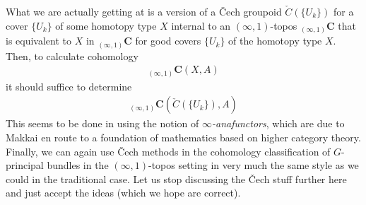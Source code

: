What we are actually getting at is a version of a \v{C}ech groupoid $\check{C}(\lbrace U_{k} \rbrace)$ for a cover $\lbrace U_{k} \rbrace$ of some homotopy type $X$ internal to an $(\infty,1)$-topos ${}_{(\infty,1)}\mathbf{C}$ that is equivalent to $X$ in ${}_{(\infty,1)}\mathbf{C}$ for good covers $\lbrace U_{k} \rbrace$ of the homotopy type $X$.
Then, to calculate cohomology
\begin{align*}
  {}_{(\infty,1)}\mathbf{C}
  \left(
    X,
    A
  \right)
\end{align*}
it should suffice to determine
\begin{align*}
  {}_{(\infty,1)}\mathbf{C}
  \left(
    \check{C}(\lbrace U_{k} \rbrace),
    A
  \right)
\end{align*}
This seems to be done in \cite{a565d200} using the notion of \textit{$\infty$-anafunctors}, which are due to Makkai en route to a foundation of mathematics based on higher category theory.
Finally, we can again use \v{C}ech methods in the cohomology classification of $G$-principal bundles in the $(\infty,1)$-topos setting in very much the same style as we could in the traditional case.
Let us stop discussing the \v{C}ech stuff further here and just accept the ideas (which we hope are correct).
